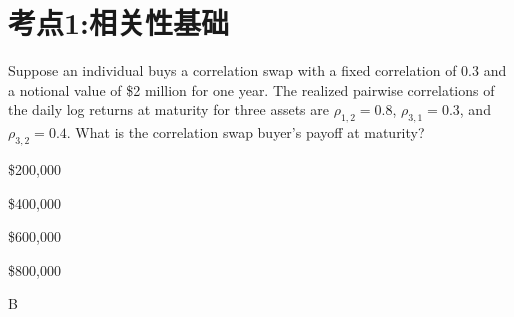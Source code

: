 \documentclass{article}
\newcounter{question} %
\begin{document}
 \tableofcontents %
\newpage




\section{考点1:相关性基础}
\setcounter{question}{0}
\begin{question}
    Suppose an individual buys a correlation swap with a fixed correlation of 0.3 and a notional value of \$2 million for one year. The realized pairwise correlations of the daily log returns at maturity for three assets are $\rho_{1,2}= 0.8$, $\rho_{3,1} = 0.3$, and $\rho_{3,2} = 0.4$. What is the correlation swap buyer's payoff at maturity?
\end{question}

\begin{choices}
    \item \$200,000
    \item \$400,000
    \item \$600,000
    \item \$800,000
\end{choices}

\begin{correctanswer}
    B
\end{correctanswer}
\end{document}
